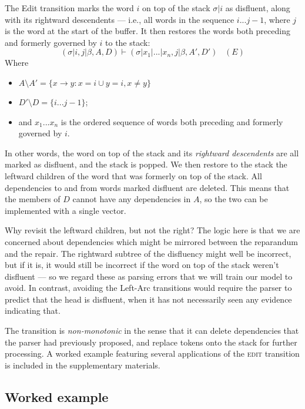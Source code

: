 \documentclass[11pt,letterpaper]{article}
\begin{document}
The Edit transition marks the word $i$ on top of the stack $\sigma | i$ as
disfluent, along with its rightward descendents --- i.e., all words in the
sequence $i...j-1$, where $j$ is the word at the start of the buffer. It then
restores the words both preceding and formerly governed by $i$ to the stack:
\begin{equation}
    (\sigma | i, j | \beta, A, D) \vdash (\sigma | x_1 | ... | x_n, j | \beta,A',D')\;\;\;(E)
    \nonumber
\end{equation}
Where 
\begin{itemize}
    \itemsep0em
    \item $A \setminus A' = \{x \rightarrow y : x = i \cup y = i, x \ne y \}$
    \item $D' \setminus D = \{i...j-1\}$;
\item  and $x_1...x_n$ is the ordered sequence of words both preceding and formerly governed
by $i$.
\end{itemize}
In other words, the word on top of the stack and its \emph{rightward descendents}
are all marked as disfluent, and the stack is popped. We then restore to the stack
the leftward children of the word that was formerly on top of the
stack. All dependencies to and from words marked disfluent are deleted. 
This means that the members of $D$ cannot have any dependencies in $A$, so the
two can be implemented with a single vector.

Why revisit the leftward children, but not the right? The logic here is that we
are concerned about dependencies which might be mirrored between the reparandum
and the repair. The rightward subtree of the disfluency might well be incorrect,
but if it is, it would still be incorrect if the word on top of the stack weren't
disfluent --– so we regard these as parsing errors that we will train our model
to avoid. In contrast, avoiding the Left-Arc transitions would require the parser to
predict that the head is disfluent, when it has not necessarily seen any evidence
indicating that.

The transition is \emph{non-monotonic} in the sense that it can delete dependencies
that the parser had previously proposed, and replace tokens onto the stack for
further processing. 
A worked example featuring several applications of the \textsc{edit} transition
is included in the supplementary materials.

\subsection{Worked example}
\end{document}
